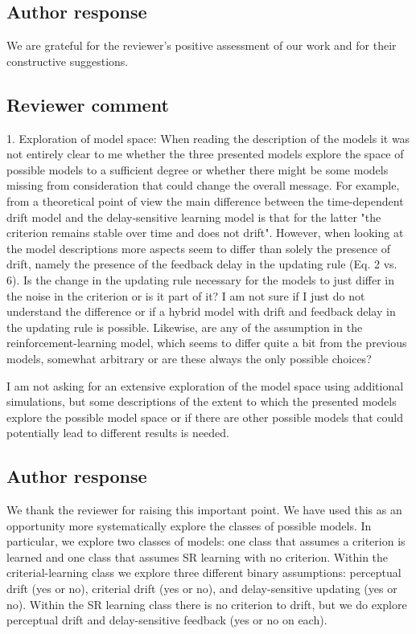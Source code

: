\documentclass[12pt]{article}
\begin{document}
\subsection{Author response}
We are grateful for the reviewer's positive assessment of
our work and for their constructive suggestions.

\subsection{Reviewer comment}
1. Exploration of model space: When reading the description
of the models it was not entirely clear to me whether the
three presented models explore the space of possible models
to a sufficient degree or whether there might be some models
missing from consideration that could change the overall
message. For example, from a theoretical point of view the
main difference between the time-dependent drift model and
the delay-sensitive learning model is that for the latter
"the criterion remains stable over time and does not drift".
However, when looking at the model descriptions more aspects
seem to differ than solely the presence of drift, namely the
presence of the feedback delay in the updating rule (Eq. 2
vs. 6). Is the change in the updating rule necessary for the
models to just differ in the noise in the criterion or is it
part of it? I am not sure if I just do not understand the
difference or if a hybrid model with drift and feedback
delay in the updating rule is possible. Likewise, are any of
the assumption in the reinforcement-learning model, which
seems to differ quite a bit from the previous models,
somewhat arbitrary or are these always the only possible
choices?

I am not asking for an extensive exploration of the model
space using additional simulations, but some descriptions of
the extent to which the presented models explore the
possible model space or if there are other possible models
that could potentially lead to different results is needed.

\subsection{Author response}
We thank the reviewer for raising this important point. We
have used this as an opportunity more systematically explore
the classes of possible models.  In particular, we explore
two classes of models: one class that assumes a criterion is
learned and one class that assumes SR learning with no
criterion.  Within the criterial-learning class we explore
three different binary assumptions: perceptual drift (yes or
no), criterial drift (yes or no), and delay-sensitive
updating (yes or no).  Within the SR learning class there is
no criterion to drift, but we do explore perceptual drift
and delay-sensitive feedback (yes or no on each). 
\end{document}
